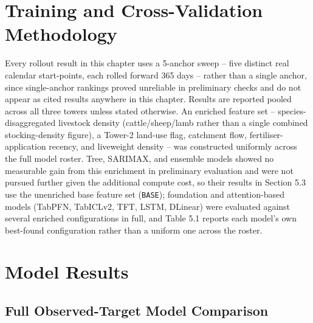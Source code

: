 \section{Training and Cross-Validation Methodology}

Every rollout result in this chapter uses a 5-anchor sweep -- five distinct real calendar
start-points, each rolled forward 365 days -- rather than a single anchor, since single-anchor
rankings proved unreliable in preliminary checks and do not appear as cited results anywhere in
this chapter. Results are reported pooled across all three towers unless stated otherwise. An
enriched feature set -- species-disaggregated livestock density (cattle/sheep/lamb rather than a
single combined stocking-density figure), a Tower-2 land-use flag, catchment flow, fertiliser-
application recency, and liveweight density -- was constructed uniformly across the full model
roster. Tree, SARIMAX, and ensemble models showed no measurable gain from this enrichment in
preliminary evaluation and were not pursued further given the additional compute cost, so their
results in Section 5.3 use the unenriched base feature set (\texttt{BASE}); foundation and
attention-based models (TabPFN, TabICLv2, TFT, LSTM, DLinear) were evaluated against several
enriched configurations in full, and Table 5.1 reports each model's own best-found configuration
rather than a uniform one across the roster.

\section{Model Results}

\subsection{Full Observed-Target Model Comparison}

